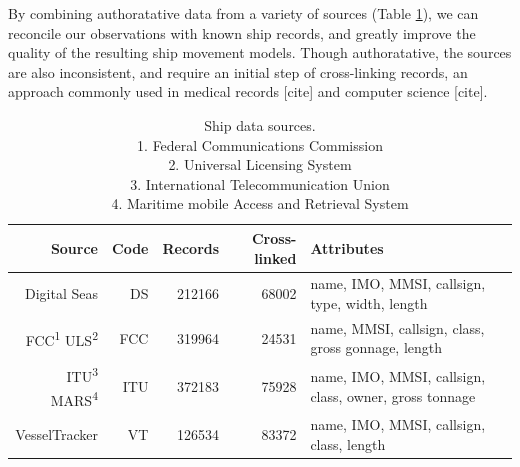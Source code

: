 
By combining authoratative data from a variety of sources (Table \ref{table:ships-data-sources}), we can reconcile our observations with known ship records, and greatly improve the quality of the resulting ship movement models. Though authoratative, the sources are also inconsistent, and require an initial step of cross-linking records, an approach commonly used in medical records [cite] and computer science [cite].

\begin{table}[htbp]
  \begin{tabular}{rrrrl}%
    \hline
    Source & Code & Records & Cross-linked & Attributes \\
    \hline
     Digital Seas & DS & 212166 & 68002 & {\footnotesize name, IMO, MMSI, callsign, type, width, length} \\
      FCC\textsuperscript{1} ULS\textsuperscript{2} & FCC & 319964 & 24531 & {\footnotesize name, MMSI, callsign, class, gross gonnage, length} \\
      ITU\textsuperscript{3} MARS\textsuperscript{4} & ITU & 372183 & 75928 & {\footnotesize name, IMO, MMSI, callsign, class, owner, gross tonnage}\\ 
     VesselTracker & VT & 126534 & 83372 & {\footnotesize name, IMO, MMSI, callsign, class, length}
  \end{tabular}
  \caption{Ship data sources.\\ 
  1. Federal Communications Commission \\ 
  2. Universal Licensing System \\
  3. International Telecommunication Union \\ 
  4. Maritime mobile Access and Retrieval System}
  \label{table:ships-data-sources}
\end{table}

